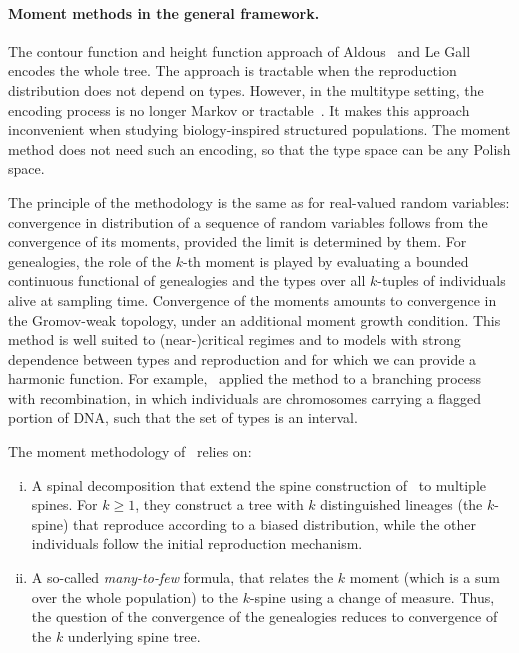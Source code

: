 \paragraph{Moment methods in the general framework.}
The contour function and height function approach of Aldous~\cite{aldous_continuum_1991} and Le Gall~\cite{le_gall_brownian_1991} encodes the whole tree. The approach is tractable when the reproduction distribution does not depend on types. However, in the multitype setting, the encoding process is no longer Markov or tractable~\cite{popovic_coalescent_2014}. It makes this approach inconvenient when studying biology-inspired structured populations. 
The moment method does not need such an encoding, so that the type space can be any Polish space.

The principle of the methodology is the same as for real-valued random variables: convergence in distribution of a sequence of random variables follows from the convergence of its moments, provided the limit is determined by them. 
For genealogies, the role of the $k$-th moment is played by evaluating a bounded continuous functional of genealogies and the types over all $k$-tuples of individuals alive at sampling time. Convergence of the moments amounts to convergence in the Gromov-weak topology, under an additional moment growth condition.
This method is well suited to (near-)critical regimes and to models with strong dependence between types and reproduction and for which we can provide a harmonic function. For example,~\citet{Foutel_Schertzer} applied the method to a branching process with recombination, in which individuals are chromosomes carrying a flagged portion of DNA, such that the set of types is an interval.

\medskip

The moment methodology of~\citet*{Foutel_Schertzer} relies on:
\begin{enumerate}[(i)]
\item A spinal decomposition that extend the spine construction of~\cite{kurtz_conceptual_1997,kurtz_conceptual_1997} to multiple spines. For $k\geq 1$, they construct a tree with $k$ distinguished lineages (the $k$-spine) that reproduce according to a biased distribution, while the other individuals follow the initial reproduction mechanism.
\item A so-called \emph{many-to-few} formula, that relates the $k$ moment (which is a sum over the whole population) to the $k$-spine using a change of measure. Thus, the question of the convergence of the genealogies reduces to convergence of the $k$ underlying spine tree.
\end{enumerate}

